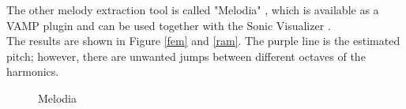 \FloatBarrier
\noindent The other melody extraction tool is called "Melodia" \cite{melodia1}, which is available as a VAMP plugin and can be used together with the Sonic Visualizer \cite{sonviz1}.\\
The results are shown in Figure \ref{fem} and \ref{ram}.
The purple line is the estimated pitch; however, there are unwanted jumps between different octaves of the harmonics. 

\begin{figure}[htbp]
	\centering
	\caption{Melodia}
	\label{fig:melodia}
\end{figure}


